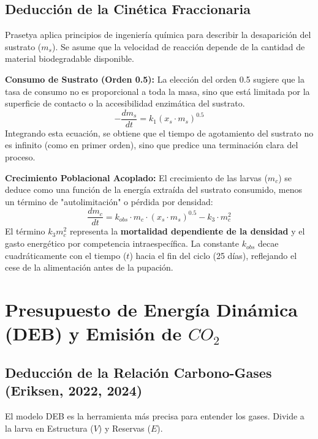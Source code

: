 \documentclass{article}
\begin{document}
\subsection{Deducción de la Cinética Fraccionaria}
Prasetya aplica principios de ingeniería química para describir la desaparición del sustrato ($m_s$). Se asume que la velocidad de reacción depende de la cantidad de material biodegradable disponible.

\textbf{Consumo de Sustrato (Orden 0.5):}
La elección del orden 0.5 sugiere que la tasa de consumo no es proporcional a toda la masa, sino que está limitada por la superficie de contacto o la accesibilidad enzimática del sustrato.
\begin{equation}
    -\frac{dm_s}{dt} = k_1 (x_s \cdot m_s)^{0.5}
\end{equation}
Integrando esta ecuación, se obtiene que el tiempo de agotamiento del sustrato no es infinito (como en primer orden), sino que predice una terminación clara del proceso.

\textbf{Crecimiento Poblacional Acoplado:}
El crecimiento de las larvas ($m_c$) se deduce como una función de la energía extraída del sustrato consumido, menos un término de "autolimitación" o pérdida por densidad:
\begin{equation}
    \frac{dm_c}{dt} = k_{obs} \cdot m_c \cdot (x_s \cdot m_s)^{0.5} - k_3 \cdot m_c^2
\end{equation}
El término $k_3 m_c^2$ representa la \textbf{mortalidad dependiente de la densidad} y el gasto energético por competencia intraespecífica. La constante $k_{obs}$ decae cuadráticamente con el tiempo ($t$) hacia el fin del ciclo (25 días), reflejando el cese de la alimentación antes de la pupación.

\section{Presupuesto de Energía Dinámica (DEB) y Emisión de $CO_2$}

\subsection{Deducción de la Relación Carbono-Gases (Eriksen, 2022, 2024)}
El modelo DEB es la herramienta más precisa para entender los gases. Divide a la larva en Estructura ($V$) y Reservas ($E$). 
\end{document}
